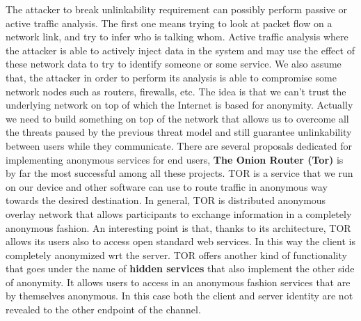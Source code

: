 The attacker to break unlinkability requirement can possibly perform passive or active traffic analysis. The first one means trying to look at packet flow on a network link, and try to infer who is talking whom. Active traffic analysis where the attacker is able to actively inject data in the system and may use the effect of these network data to try to identify someone or some service. We also assume that, the attacker in order to perform its analysis is able to compromise some network nodes such as routers, firewalls, etc. The idea is that we can't trust the underlying network on top of which the Internet is based for anonymity. Actually we need to build something on top of the network that allows us to overcome all the threats paused by the previous threat model and still guarantee unlinkability between users while they communicate. There are several proposals dedicated for implementing anonymous services for end users, \textbf{The Onion Router (Tor)} is by far the most successful among all these projects. TOR is a service that we run on our device and other software can use to route traffic in anonymous way towards the desired destination. In general, TOR is distributed anonymous overlay network that allows participants to exchange information in a completely anonymous fashion. An interesting point is that, thanks to its architecture, TOR allows its users also to access open standard web services. In this way the client is completely anonymized wrt the server. TOR offers another kind of functionality that goes under the name of \textbf{hidden services} that also implement the other side of anonymity. It allows users to access in an anonymous fashion services that are by themselves anonymous. In this case both the client and server identity are not revealed to the other endpoint of the channel.
